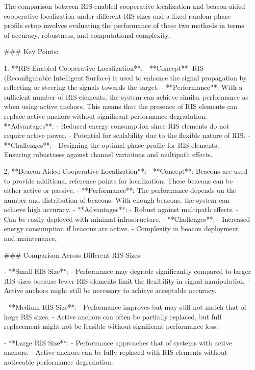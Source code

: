 The comparison between RIS-enabled cooperative localization and beacon-aided cooperative localization under different RIS sizes and a fixed random phase profile setup involves evaluating the performance of these two methods in terms of accuracy, robustness, and computational complexity.

### Key Points:

1. **RIS-Enabled Cooperative Localization**:
   - **Concept**: RIS (Reconfigurable Intelligent Surface) is used to enhance the signal propagation by reflecting or steering the signals towards the target.
   - **Performance**: With a sufficient number of RIS elements, the system can achieve similar performance as when using active anchors. This means that the presence of RIS elements can replace active anchors without significant performance degradation.
   - **Advantages**: 
     - Reduced energy consumption since RIS elements do not require active power.
     - Potential for scalability due to the flexible nature of RIS.
   - **Challenges**: 
     - Designing the optimal phase profile for RIS elements.
     - Ensuring robustness against channel variations and multipath effects.

2. **Beacon-Aided Cooperative Localization**:
   - **Concept**: Beacons are used to provide additional reference points for localization. These beacons can be either active or passive.
   - **Performance**: The performance depends on the number and distribution of beacons. With enough beacons, the system can achieve high accuracy.
   - **Advantages**: 
     - Robust against multipath effects.
     - Can be easily deployed with minimal infrastructure.
   - **Challenges**: 
     - Increased energy consumption if beacons are active.
     - Complexity in beacon deployment and maintenance.

### Comparison Across Different RIS Sizes:

- **Small RIS Size**: 
  - Performance may degrade significantly compared to larger RIS sizes because fewer RIS elements limit the flexibility in signal manipulation.
  - Active anchors might still be necessary to achieve acceptable accuracy.

- **Medium RIS Size**: 
  - Performance improves but may still not match that of large RIS sizes.
  - Active anchors can often be partially replaced, but full replacement might not be feasible without significant performance loss.

- **Large RIS Size**: 
  - Performance approaches that of systems with active anchors.
  - Active anchors can be fully replaced with RIS elements without noticeable performance degradation.

